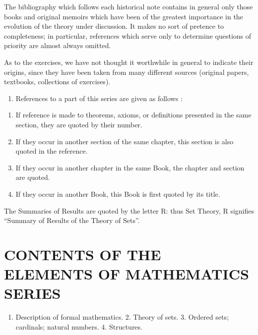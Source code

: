 The bibliography which follows each historical note contains in general only those books and original memoirs which have been of the greatest importance in the evolution of the theory under discussion. It makes no sort of pretence to completeness; in particular, references which serve only to determine questions of priority are almost always omitted.

As to the exercises, we have not thought it worthwhile in general to indicate their origins, since they have been taken from many different sources (original papers, textbooks, collections of exercises).

\begin{enumerate}
\def\labelenumi{\arabic{enumi}.}
\setcounter{enumi}{10}
\tightlist
\item
  References to a part of this series are given as follows :
\end{enumerate}

\begin{enumerate}
\def\labelenumi{\alph{enumi})}
\item
  If reference is made to theorems, axioms, or definitions presented in the same section, they are quoted by their number.
\item
  If they occur in another section of the same chapter, this section is also quoted in the reference.
\item
  If they occur in another chapter in the same Book, the chapter and section are quoted.
\item
  If they occur in another Book, this Book is first quoted by its title.
\end{enumerate}

The Summaries of Results are quoted by the letter R: thus Set Theory, R signifies ``Summary of Results of the Theory of Sets''.

\chapter*{CONTENTS OF THE ELEMENTS OF MATHEMATICS SERIES}
{}


\begin{enumerate}
\def\labelenumi{\arabic{enumi}.}
\tightlist
\item
  Description of formal mathematics. 2. Theory of sets. 3. Ordered sets; cardinals; natural numbers. 4. Structures.
\end{enumerate}


